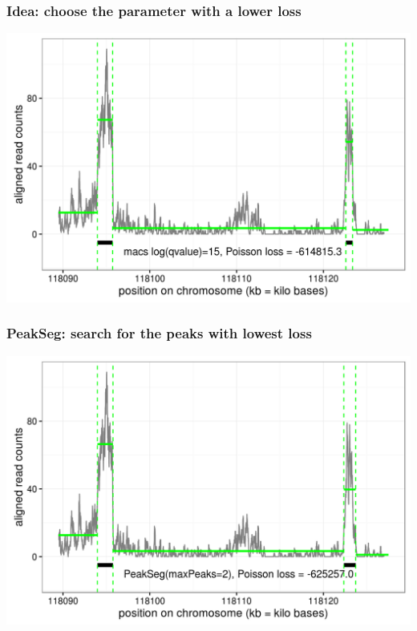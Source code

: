 \documentclass{beamer}
\begin{document}
\begin{frame}
  \frametitle{Idea: choose the parameter with a lower loss}
  \includegraphics[width=1\textwidth]{figure-macs-problem-15.png}
\end{frame}

\begin{frame}
  \frametitle{PeakSeg: search for the peaks with lowest loss}
  \includegraphics[width=1\textwidth]{figure-macs-problem-PeakSeg.png}
\end{frame}
\end{document}
